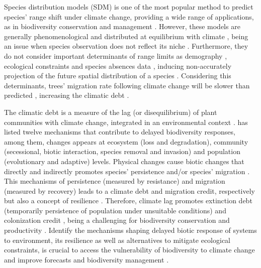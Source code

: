 Species distribution models (SDM) is one of the most popular method to predict species' range shift under climate change, providing a wide range of applications, as in biodiversity conservation and management \parencite{Guisan2005,Guisan2013}.
However, these models are generally phenomenological and  distributed at equilibrium with climate \parencite[e.g.][]{Pigot2013}, being an issue when species observation does not reflect its niche \parencite{Schurr2012}.
Furthermore, they do not consider important determinants of range limits as demography \parencite{Louthan2015}, ecological constraints \parencite{Wisz2013,Pigot2013} and species absences data \parencite{Koshkina2017}, inducing non-accurately projection of the future spatial distribution of a species \parencite{Tavecchia2016}.
Considering this determinants, trees' migration rate following climate change will be slower than predicted \parencite{Bertrand2011,Sittaro2017}, increasing the climatic debt \parencite{Bertrand2016}.

The climatic debt is a measure of the lag (or disequilibrium) of plant communities with climate change, integrated in an environmental context \parencite{Bertrand2016}.
\textcite{Essl2015} has listed twelve mechanisms that contribute to delayed biodiversity responses, among them, changes appears at ecosystem (loss and degradation), community (secessional, biotic interaction, species removal and invasion) and population (evolutionary and adaptive) levels.
Physical changes cause biotic changes that directly and indirectly promotes species' persistence and/or species' migration \parencite{Bertrand2016}.
This mechanisms of persistence (measured by resistance) and migration (measured by recovery) leads to a climate debt and migration credit, respectively \parencite{Bertrand2016} but also a concept of resilience\footnotemark{} \parencite{Oliver2015}.
Therefore, climate lag promotes extinction debt (temporarily persistence of population under unsuitable conditions) and colonization credit \parencite[suitable locations are not occupied due species constraints;][]{talluto2017}, being a challenging for biodiversity conservation \parencite{Kuussaari2009} and productivity \parencite{Lasch2002}.
Identify the mechanisms shaping delayed biotic response of systems to environment, its resilience as well as alternatives to mitigate ecological constraints, is crucial to access the vulnerability of biodiversity to climate change and improve forecasts and biodiversity management \parencite{Essl2015,Oliver2015,Bertrand2016}.

